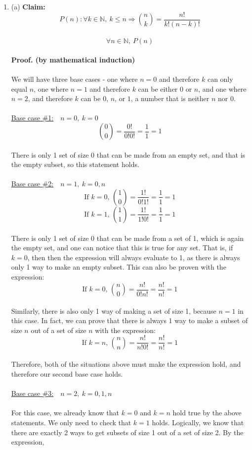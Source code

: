\documentclass{article}
\newcommand{\N}{\mathbb{N}}
\begin{document}
\begin{enumerate}
	\item (a) \textbf{Claim:}\ $$P(n): \forall k \in \N,\ k \leq n \Rightarrow {{n}\choose{k}} = \frac{n!}{k!(n-k)!}$$ \\
	 $$\forall n \in \N,\ P(n)$$ \\
	 \textbf{Proof. (by mathematical induction)} \\\\
	 We will have three base cases - one where $n = 0$ and therefore $k$ can only equal $n$, one where $n = 1$ and therefore $k$ can be either $0$ or $n$, and one where $n=2$, and therefore $k$ can be $0$, $n$, or $1$, a number that is neither $n$ nor $0$. \\\\
	 \underline{Base case \#1:}\ \ $n = 0,\ k = 0$ $${{0}\choose{0}} = \frac{0!}{0!0!} = \frac{1}{1} = 1$$ \\
	 There is only 1 set of size 0 that can be made from an empty set, and that is the empty subset, so this statement holds. \\\\
	 \underline{Base case \#2:}\ \ $n = 1,\ k = 0,n$ $$\text{If $k=0$,\ \ \ \ }{{1}\choose{0}} = \frac{1!}{0!1!} = \frac{1}{1} = 1$$
	 $$\textrm{If $k=1$,\ \ \ \ }{{1}\choose{1}} = \frac{1!}{1!0!} = \frac{1}{1} = 1$$ \\
	 There is only 1 set of size 0 that can be made from a set of 1, which is again the empty set, and one can notice that this is true for any set. That is, if $k=0$, then  then the expression will always evaluate to 1, as there is always only 1 way to make an empty subset. This can also be proven with the expression: 
	 $$\textrm{If $k=0$,\ \ \ \ }{{n}\choose{0}} = \frac{n!}{0!n!} = \frac{n!}{n!} = 1$$ \\
	 Similarly, there is also only 1 way of making a set of size 1, because $n=1$ in this case. In fact, we can prove that there is always 1 way to make a subset of size $n$ out of a set of size $n$ with the expression: 
	 $$\textrm{If $k=n$,\ \ \ \ }{{n}\choose{n}} = \frac{n!}{n!0!} = \frac{n!}{n!} = 1$$ \\
	 Therefore, both of the situations above must make the expression hold, and therefore our second base case holds. \\\\
	 \underline{Base case \#3:}\ \ $n = 2,\ k=0,1,n$ \\\\
	 For this case, we already know that $k=0$ and $k=n$ hold true by the above statements. We only need to check that $k=1$ holds. Logically, we know that there are exactly 2 ways to get subsets of size 1 out of a set of size 2. By the expression, 

\end{enumerate}
\end{document}
